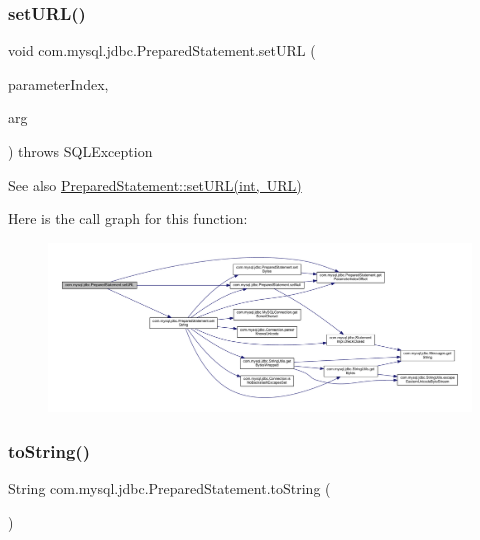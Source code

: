 \subsubsection{\texorpdfstring{set\+U\+R\+L()}{setURL()}}
{\footnotesize\ttfamily void com.\+mysql.\+jdbc.\+Prepared\+Statement.\+set\+U\+RL (\begin{DoxyParamCaption}\item[{int}]{parameter\+Index,  }\item[{U\+RL}]{arg }\end{DoxyParamCaption}) throws S\+Q\+L\+Exception}

\begin{DoxySeeAlso}{See also}
\mbox{\hyperlink{classcom_1_1mysql_1_1jdbc_1_1_prepared_statement_a19011de47765abe0b12d60a3ad76ceb1}{Prepared\+Statement\+::set\+U\+R\+L(int, U\+R\+L)}} 
\end{DoxySeeAlso}
Here is the call graph for this function\+:
\nopagebreak
\begin{figure}[H]
\begin{center}
\leavevmode
\includegraphics[width=350pt]{classcom_1_1mysql_1_1jdbc_1_1_prepared_statement_a19011de47765abe0b12d60a3ad76ceb1_cgraph}
\end{center}
\end{figure}
\mbox{\label{classcom_1_1mysql_1_1jdbc_1_1_prepared_statement_a21fa3680558df3800e15b9ee1a38ae70}} 
\subsubsection{\texorpdfstring{to\+String()}{toString()}}
{\footnotesize\ttfamily String com.\+mysql.\+jdbc.\+Prepared\+Statement.\+to\+String (\begin{DoxyParamCaption}{ }\end{DoxyParamCaption})}

